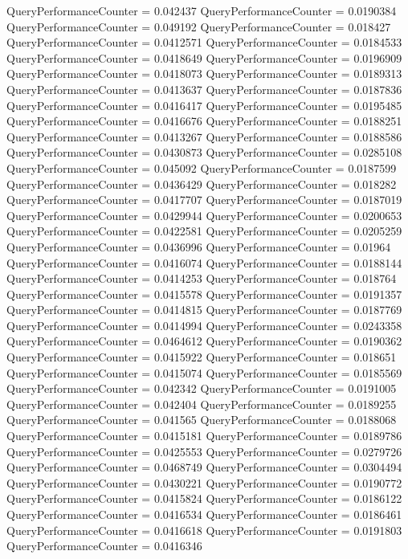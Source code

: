 \documentclass[9pt]{article}
\theoremstyle{plain}
\theoremstyle{definition}
\theoremstyle{remark}
\numberwithin{equation}{section}
\begin{document}
QueryPerformanceCounter  =  0.042437
QueryPerformanceCounter  =  0.0190384
QueryPerformanceCounter  =  0.049192
QueryPerformanceCounter  =  0.018427
QueryPerformanceCounter  =  0.0412571
QueryPerformanceCounter  =  0.0184533
QueryPerformanceCounter  =  0.0418649
QueryPerformanceCounter  =  0.0196909
QueryPerformanceCounter  =  0.0418073
QueryPerformanceCounter  =  0.0189313
QueryPerformanceCounter  =  0.0413637
QueryPerformanceCounter  =  0.0187836
QueryPerformanceCounter  =  0.0416417
QueryPerformanceCounter  =  0.0195485
QueryPerformanceCounter  =  0.0416676
QueryPerformanceCounter  =  0.0188251
QueryPerformanceCounter  =  0.0413267
QueryPerformanceCounter  =  0.0188586
QueryPerformanceCounter  =  0.0430873
QueryPerformanceCounter  =  0.0285108
QueryPerformanceCounter  =  0.045092
QueryPerformanceCounter  =  0.0187599
QueryPerformanceCounter  =  0.0436429
QueryPerformanceCounter  =  0.018282
QueryPerformanceCounter  =  0.0417707
QueryPerformanceCounter  =  0.0187019
QueryPerformanceCounter  =  0.0429944
QueryPerformanceCounter  =  0.0200653
QueryPerformanceCounter  =  0.0422581
QueryPerformanceCounter  =  0.0205259
QueryPerformanceCounter  =  0.0436996
QueryPerformanceCounter  =  0.01964
QueryPerformanceCounter  =  0.0416074
QueryPerformanceCounter  =  0.0188144
QueryPerformanceCounter  =  0.0414253
QueryPerformanceCounter  =  0.018764
QueryPerformanceCounter  =  0.0415578
QueryPerformanceCounter  =  0.0191357
QueryPerformanceCounter  =  0.0414815
QueryPerformanceCounter  =  0.0187769
QueryPerformanceCounter  =  0.0414994
QueryPerformanceCounter  =  0.0243358
QueryPerformanceCounter  =  0.0464612
QueryPerformanceCounter  =  0.0190362
QueryPerformanceCounter  =  0.0415922
QueryPerformanceCounter  =  0.018651
QueryPerformanceCounter  =  0.0415074
QueryPerformanceCounter  =  0.0185569
QueryPerformanceCounter  =  0.042342
QueryPerformanceCounter  =  0.0191005
QueryPerformanceCounter  =  0.042404
QueryPerformanceCounter  =  0.0189255
QueryPerformanceCounter  =  0.041565
QueryPerformanceCounter  =  0.0188068
QueryPerformanceCounter  =  0.0415181
QueryPerformanceCounter  =  0.0189786
QueryPerformanceCounter  =  0.0425553
QueryPerformanceCounter  =  0.0279726
QueryPerformanceCounter  =  0.0468749
QueryPerformanceCounter  =  0.0304494
QueryPerformanceCounter  =  0.0430221
QueryPerformanceCounter  =  0.0190772
QueryPerformanceCounter  =  0.0415824
QueryPerformanceCounter  =  0.0186122
QueryPerformanceCounter  =  0.0416534
QueryPerformanceCounter  =  0.0186461
QueryPerformanceCounter  =  0.0416618
QueryPerformanceCounter  =  0.0191803
QueryPerformanceCounter  =  0.0416346
\end{document}

